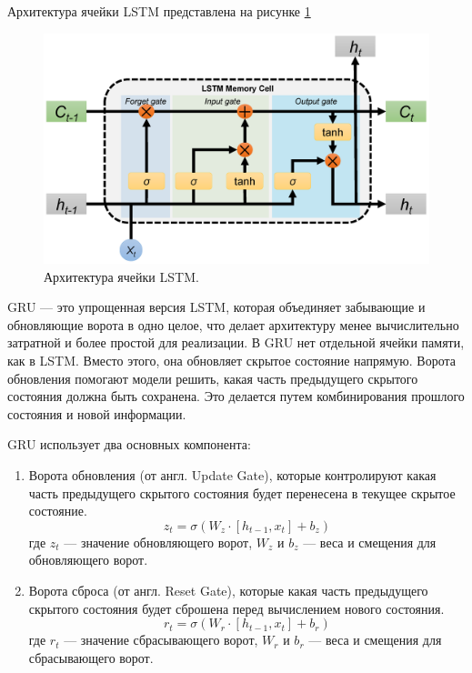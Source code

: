 \documentclass[a4paper,12pt]{extarticle}
\begin{document}
Архитектура ячейки LSTM представлена на рисунке \ref{fig:lstm_arch}

\begin{figure}[ht]
	\centering
	\includegraphics[scale=0.1]{lstm-cell.png}
	\caption{Архитектура ячейки LSTM.}
	\label{fig:lstm_arch}
\end{figure}


GRU — это упрощенная версия LSTM, которая объединяет забывающие и обновляющие ворота в одно целое, что делает архитектуру менее вычислительно затратной и более простой для реализации. В GRU нет отдельной ячейки памяти, как в LSTM. Вместо этого, она обновляет скрытое состояние напрямую. Ворота обновления помогают модели решить, какая часть предыдущего скрытого состояния должна быть сохранена. Это делается путем комбинирования прошлого состояния и новой информации.

GRU использует два основных компонента:
\begin{enumerate}[label=\arabic*.]
	\item Ворота обновления (от англ. Update Gate), которые контролируют какая часть предыдущего скрытого состояния будет перенесена в текущее скрытое состояние.
	\begin{equation}
		z_t = \sigma(W_z \cdot [h_{t-1}, x_t] + b_z)
	\end{equation}
	где \( z_t \) — значение обновляющего ворот, \( W_z \) и \( b_z \) — веса и смещения для обновляющего ворот.
	\item Ворота сброса (от англ. Reset Gate), которые какая часть предыдущего скрытого состояния будет сброшена перед вычислением нового состояния.
	\begin{equation}
		r_t = \sigma(W_r \cdot [h_{t-1}, x_t] + b_r)
	\end{equation}
	где \( r_t \) — значение сбрасывающего ворот, \( W_r \) и \( b_r \) — веса и смещения для сбрасывающего ворот.
\end{enumerate}
\end{document}
